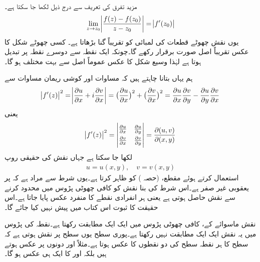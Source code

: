 مزید  تفرق کی تعریف سے  درج ذیل لکھا جا سکتا ہے۔
\begin{align*}
\lim_{z\to z_0} \abs{\frac{f(z)-f(z_0)}{z-z_0}}=\abs{f'(z_0)}
\end{align*} 
یوں نقش  چھوٹے قطعات کی لمبائی کو تقریباً  گنا بڑھاتا ہے۔ کسی چھوٹے شکل کا عکس تقریباً اصل صورت برقرار رکھے گا۔چونکہ  ایک نقطہ سے دوسرے نقطہ پر تبدیل ہوتا ہے لہٰذا وسیع شکل کا عکس عموماً اصل سے بہت مختلف ہو گا۔ 

ہم یہاں بتانا چاہتے ہیں کہ مساوات  اور کوشی ریمان مساوات سے
\begin{align}\label{مساوات_نقش_عمومی_منحنی_ٹ}
\abs{f'(z)}^2=\abs{\frac{\partial u}{\partial x}+i\frac{\partial v}{\partial x}}=\big(\frac{\partial u}{\partial x}\big)^2+\big(\frac{\partial v}{\partial x}\big)^2=\frac{\partial u}{\partial x}\frac{\partial v}{\partial y}-\frac{\partial u}{\partial y}\frac{\partial v}{\partial x}
\end{align}
یعنی
\begin{align}\label{مساوات_نقش_عمومی_منحنی_ث}
\abs{f'(z)}^2=
\begin{vmatrix}
\frac{\partial u}{\partial x}&\frac{\partial u}{\partial y}\\[1ex]
\frac{\partial v}{\partial x}&\frac{\partial v}{\partial y}
\end{vmatrix}=
\frac{\partial(u,v)}{\partial(x,y)}
\end{align}
لکھا جا سکتا ہے جہاں نقش  کی حقیقی روپ
\begin{align*}
u=u(x,y),\quad v=v(x,y)
\end{align*}
استعمال کرتے ہوئے  مقطع،  (حصہ ) کو ظاہر کرتا ہے۔یوں شرط  سے مراد ہے کہ  پر یعقوبی غیر صفر ہے۔اس شرط کی بنا نقش  کو کافی چھوٹی پڑوس میں محدود کرنے سے  نقش حاصل ہوتی ہے یعنی ہر انفرادی نقطے کا منفرد عکس پایا جاتا ہے۔اس حقیقت کا ثبوت اس کتاب میں پیش نہیں کیا جائے گا۔ 

\quad
نقش  ماسوائے  کے، کافی چھوٹی پڑوس میں ایک ایک مطابقت رکھتا ہے۔نقطہ  کی پڑوس میں یہ نقش ایک ایک مطابقت نہیں رکھتا ہے۔پوری  سطح یوں  سطح پر نقش ہوتی ہے کہ  سطح کا ہر نقطہ   سطح  کی دو نقطوں کا عکس ہوتا ہے۔مثلاً  اور  دونوں  پر عکس ہوتے ہیں بلکہ  اور  کا ایک ہی عکس  ہو گا۔


